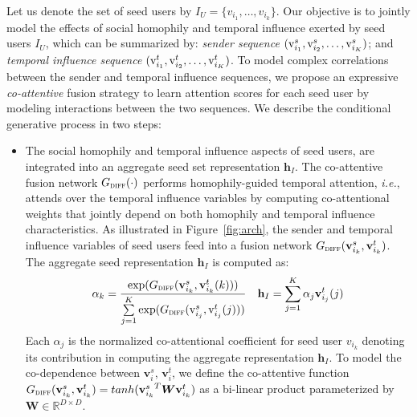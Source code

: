 \documentclass[sigconf]{acmart}
\def\rv{{\textnormal{v}}}
\def\rvh{{\mathbf{h}}}
\def\rvv{{\mathbf{v}}}
\def\mW{{\bm{W}}}
\def\sR{{\mathbb{R}}}
\begin{document}
Let us denote the set of seed users by $I_U = \{ v_{i_1}, \dots, v_{i_k} \}$.
Our objective is to jointly model the effects of social homophily and temporal influence exerted by seed users $I_U$, which can be summarized by:
\textit{sender sequence} $(\rv^s_{i_1}, \rv^s_{i_2}, \dots, \rv^s_{i_K})$; and \textit{temporal influence sequence} $(\rv^{t}_{i_1}, \rv^{t}_{i_2}, \dots, \rv^{t}_{i_K})$.
To model complex correlations between the sender and temporal influence sequences, 
we propose an expressive \textit{co-attentive} fusion strategy to learn attention scores for each seed user by modeling interactions between the two sequences.
We describe the conditional generative process in two steps:

\vspace{-2pt}
\begin{itemize}[leftmargin=*]
\item The social homophily and temporal influence aspects of seed users, are integrated into an aggregate seed set representation $\rvh_I$.
The co-attentive fusion network $G_{\textsc{diff}} (\cdot)$ performs homophily-guided temporal attention, \textit{i.e.}, attends over the temporal influence variables by computing co-attentional weights that jointly depend on both homophily and temporal influence characteristics.
As illustrated in Figure~\ref{fig:arch}, the sender and temporal influence variables of seed users feed into a fusion network $G_{\textsc{diff}}(\rvv^s_{i_k}, \rvv^{t}_{i_k})$.
The aggregate seed representation $\rvh_I$ is computed as:
\begin{align}
\alpha_{k} = \frac{ \exp( G_{\textsc{diff}}(\rvv^s_{i_k}, \rvv^{t}_{i_k} (k))) }{\sum\limits_{j=1}^K \exp(G_{\textsc{diff}}(\rv^s_{i_j}, \rv^{t}_{i_j} (j))) }  \hspace{10pt} \rvh_I  = \sum\limits_{j=1}^K \alpha_j \rvv^{t}_{i_j} (j)
\end{align}
Each $\alpha_j$ is the normalized co-attentional coefficient for seed user $v_{i_k}$ denoting its  contribution in computing the aggregate representation $\rvh_I$.
To model the co-dependence between $\rvv^s_i$, $\rvv^{t}_i$, we define the co-attentive function $G_{\textsc{diff}}(\rvv^s_{i_k}, \rvv^{t}_{i_k}) = tanh({\rvv^s_{i_k}}^T \mW \rvv^{t}_{i_k})$ as a bi-linear product parameterized by $\mW \in \sR^{D \times D}$. 



\end{itemize}
\end{document}
